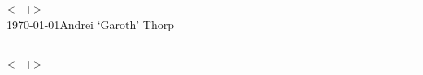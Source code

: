 \documentclass[a4paper,12pt]{article}
\newcommand{\HRule}{\rule{\linewidth}{0.5mm}}
\begin{document}
\begin{center}
{ \huge \textsc{ <++>} } \\[0.2cm]
\today \hfill Andrei `Garoth' Thorp
\HRule
\end{center}

<++>
\end{document}
